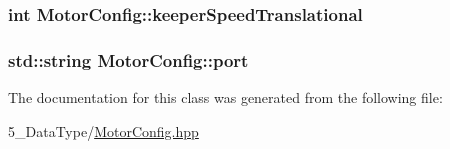 \subsubsection[{\texorpdfstring{keeper\+Speed\+Translational}{keeperSpeedTranslational}}]{\setlength{\rightskip}{0pt plus 5cm}int Motor\+Config\+::keeper\+Speed\+Translational}\hypertarget{class_motor_config_a2d71d5ba5fa077680a8e032654f3e963}{}\label{class_motor_config_a2d71d5ba5fa077680a8e032654f3e963}
\subsubsection[{\texorpdfstring{port}{port}}]{\setlength{\rightskip}{0pt plus 5cm}std\+::string Motor\+Config\+::port}\hypertarget{class_motor_config_a8c20151468f9399aaa7311b421ea16da}{}\label{class_motor_config_a8c20151468f9399aaa7311b421ea16da}


The documentation for this class was generated from the following file\+:\begin{DoxyCompactItemize}
\item 
5\+\_\+\+Data\+Type/\hyperlink{_motor_config_8hpp}{Motor\+Config.\+hpp}\end{DoxyCompactItemize}
